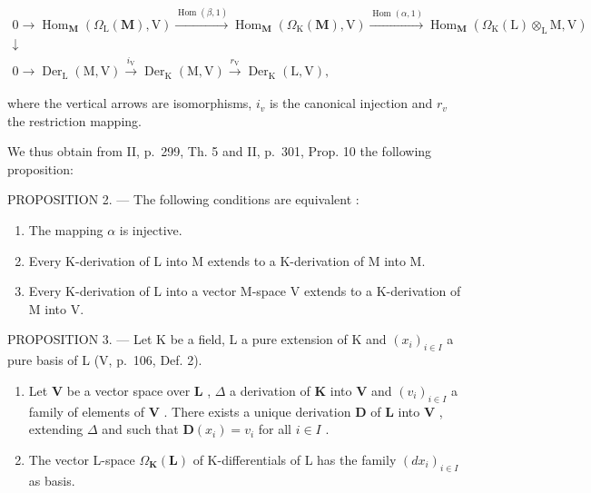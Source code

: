 \[
\begin{array}{l}0 \rightarrow \operatorname{Hom} _ {\mathbf {M}} (\Omega_ {\mathrm{L}} (\mathbf {M}), \mathrm{V}) \xrightarrow {\operatorname{Hom} (\beta , 1)} \operatorname{Hom} _ {\mathbf {M}} (\Omega_ {\mathrm{K}} (\mathbf {M}), \mathrm{V}) \xrightarrow {\operatorname{Hom} (\alpha , 1)} \operatorname{Hom} _ {\mathbf {M}} (\Omega_ {\mathrm{K}} (\mathrm{L}) \otimes_ {\mathrm{L}} \mathrm{M}, \mathrm{V})\\\downarrow\\0 \rightarrow \operatorname{Der} _ {\mathrm{L}} (\mathrm{M}, \mathrm{V}) \xrightarrow {i _ {\mathrm{V}}} \operatorname{Der} _ {\mathrm{K}} (\mathrm{M}, \mathrm{V}) \xrightarrow {r _ {\mathrm{V}}} \operatorname{Der} _ {\mathrm{K}} (\mathrm{L}, \mathrm{V}),\end{array}
\]

where the vertical arrows are isomorphisms, \(i_{v}\) is the canonical injection and \(r_{v}\) the restriction mapping.

We thus obtain from II, p.~299, Th. 5 and II, p.~301, Prop. 10 the following proposition:

PROPOSITION 2. --- The following conditions are equivalent :

\begin{enumerate}
\def\labelenumi{\alph{enumi})}
\item
  The mapping \(\alpha\) is injective.
\item
  Every K-derivation of L into M extends to a K-derivation of M into M.
\item
  Every K-derivation of L into a vector M-space V extends to a K-derivation of M into V.
\end{enumerate}

PROPOSITION 3. --- Let K be a field, L a pure extension of K and \((x_{i})_{i\in I}\) a pure basis of L (V, p.~106, Def. 2).

\begin{enumerate}
\def\labelenumi{\alph{enumi})}
\item
  Let \(\mathbf{V}\) be a vector space over \(\mathbf{L}\) , \(\Delta\) a derivation of \(\mathbf{K}\) into \(\mathbf{V}\) and \((v_i)_{i\in I}\) a family of elements of \(\mathbf{V}\) . There exists a unique derivation \(\mathbf{D}\) of \(\mathbf{L}\) into \(\mathbf{V}\) , extending \(\Delta\) and such that \(\mathbf{D}(x_i) = v_i\) for all \(i\in I\) .
\item
  The vector L-space \(\Omega_{\mathbf{K}}(\mathbf{L})\) of K-differentials of L has the family \((dx_i)_{i\in I}\) as basis.
\end{enumerate}

